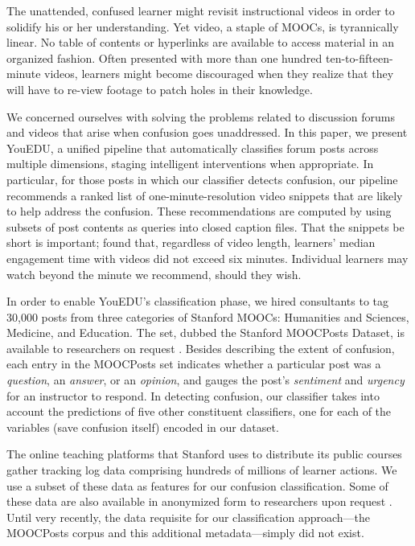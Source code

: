 \documentclass{edm_template}
\begin{document}
The unattended, confused learner might revisit instructional videos in order to solidify his or her understanding. Yet video, a staple of MOOCs, is tyrannically linear. No table of contents or hyperlinks are available to access material in an organized fashion. Often presented with more than one hundred ten-to-fifteen-minute videos, learners might become discouraged when they realize that they will have to re-view footage to patch holes in their knowledge.

We concerned ourselves with solving the problems related to discussion forums and videos that arise when confusion goes unaddressed. In this paper, we present YouEDU, a unified pipeline that automatically classifies forum posts across multiple dimensions, staging intelligent interventions when appropriate.  In particular, for those posts in which our classifier detects confusion, our pipeline recommends a ranked list of one-minute-resolution video snippets that are likely to help address the confusion. These recommendations are computed by using subsets of post contents as queries into closed caption files. That the snippets be short is important; \cite{Guo:2014:VPA:2556325.2566239} found that, regardless of video length, learners' median engagement time with videos did not exceed six minutes. Individual learners may watch beyond the minute we recommend, should they wish. 

In order to enable YouEDU's classification phase, we hired consultants to tag 30,000 posts from three categories of Stanford MOOCs: Humanities and Sciences, Medicine, and Education. The set, dubbed the Stanford MOOCPosts Dataset, is available to researchers on request \cite{stanfordMOOCPosts}. Besides describing the extent of confusion, each entry in the MOOCPosts set indicates whether a particular post was a {\em question}, an {\em answer}, or an {\em opinion}, and gauges the post's {\em sentiment} and {\em urgency} for an instructor to respond. In detecting confusion, our classifier takes into account the predictions of five other constituent classifiers, one for each of the variables (save confusion itself) encoded in our dataset.

The online teaching platforms that Stanford uses to distribute its public courses gather tracking log data comprising hundreds of millions of learner actions. We use a subset of these data as features for our confusion classification. Some of these data are also available in anonymized form to researchers upon request \cite{stanfordDataApps}. Until very recently, the data requisite for our classification approach---the MOOCPosts corpus and this additional metadata---simply did not exist. 
\end{document}
